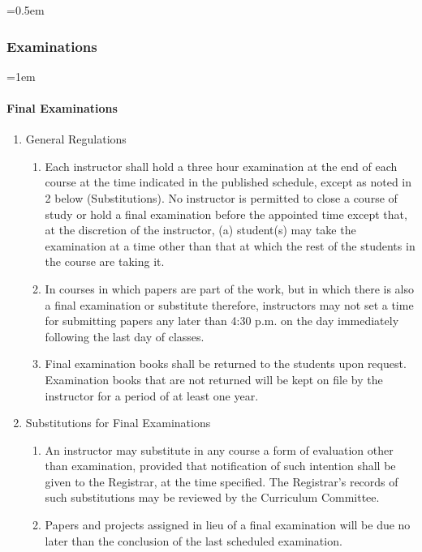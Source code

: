 \documentclass{manual}
\let\oldsubsubsection\subsubsection
\renewcommand\subsubsection{\leftskip=0.5em\oldsubsubsection}
\let\oldparagraph\paragraph
\renewcommand\paragraph{\leftskip=1em\oldparagraph}
\newcommand{\itemLevelB}{\arabic*)}
\newcommand{\itemRefB}{\arabic*}
\begin{document}
\subsubsection{Examinations}

\paragraph{Final Examinations}

\begin{enumerate}[label=\alph*]
\item General Regulations

\begin{enumerate}[label=\itemLevelB,ref=\itemRefB]
\item Each instructor shall hold a three hour examination at the end of each course at the time indicated in the published schedule, except as noted in 2 below (Substitutions). No instructor is permitted to close a course of study or hold a final examination before the appointed time except that, at the discretion of the instructor, (a) student(s) may take the examination at a time other than that at which the rest of the students in the course are taking it.

\item  In courses in which papers are part of the work, but in which there is also a final examination or substitute therefore, instructors may not set a time for submitting papers any later than 4:30 p.m. on the day immediately following the last day of classes.
\item  Final examination books shall be returned to the students upon request. Examination books that are not returned will be kept on file by the instructor for a period of at least one year.
\end{enumerate}

\item Substitutions for Final Examinations

\begin{enumerate}[label=\itemLevelB,ref=\itemRefB]
\item An instructor may substitute in any course a form of evaluation other than examination, provided that notification of such intention shall be given to the Registrar, at the time specified. The Registrar's records of such substitutions may be reviewed by the Curriculum Committee.
\item Papers and projects assigned in lieu of a final examination will be due no later than the conclusion of the last scheduled examination.
\end{enumerate}


\end{enumerate}
\end{document}
